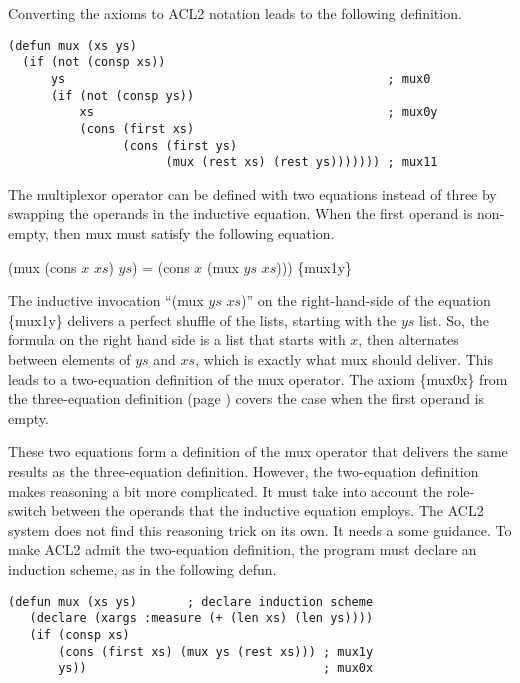 Converting the axioms to ACL2 notation leads to the following
definition.

\label{mux-defun}
\begin{Verbatim}
(defun mux (xs ys)
  (if (not (consp xs))
      ys                                             ; mux0
      (if (not (consp ys))
          xs                                         ; mux0y
          (cons (first xs)
                (cons (first ys)
                      (mux (rest xs) (rest ys))))))) ; mux11
\end{Verbatim}

\begin{aside}
The multiplexor operator can be defined with two equations instead of three
by swapping the operands in the inductive equation.
When the first operand is non-empty, then mux must satisfy the following equation.

\hspace{1cm} (mux (cons $x$ $xs$) $ys$) = (cons $x$ (mux $ys$ $xs$)))
\hfill \{mux1y\}

The inductive invocation ``(mux $ys$ $xs$)''
on the right-hand-side of the equation \{mux1y\}
delivers a perfect shuffle
of the lists, starting with the $ys$ list.
So, the formula on the right hand side is a list that starts with $x$,
then alternates between elements of $ys$ and $xs$, which is exactly what
mux should deliver. This leads to a two-equation definition of the mux operator.
The axiom \{mux0x\} from the three-equation definition
(page \pageref{def:mux})
covers the case when the first operand is empty.

These two equations form a definition of the mux operator
that delivers the same results as the three-equation definition.
However, the two-equation definition makes reasoning a bit more complicated.
It must take into account the role-switch between the operands
that the inductive equation employs.
The ACL2 system does not find this reasoning trick on its own.
It needs a some guidance.
To make ACL2 admit the two-equation definition,
the program must declare an induction scheme,
as in the following defun.
\\

\label{mux-2eq-defun}
\begin{Verbatim}
(defun mux (xs ys)       ; declare induction scheme
   (declare (xargs :measure (+ (len xs) (len ys))))
   (if (consp xs)
       (cons (first xs) (mux ys (rest xs))) ; mux1y
       ys))                                 ; mux0x
\end{Verbatim}

\caption{Defining mux with Two Equations}
\label{aside:mux-2eq}
\end{aside}

